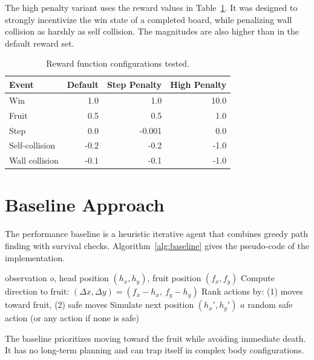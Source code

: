 \documentclass[10pt, conference, letterpaper]{IEEEtran}
\begin{document}
The high penalty variant uses the reward values in Table~\ref{tab:rewards}. It was designed to strongly incentivize the win state of a completed board, while penalizing wall collision as harshly as self collision. The magnitudes are also higher than in the default reward set.

\begin{table}[t]
\centering
\caption{Reward function configurations tested.}
\label{tab:rewards}
\begin{tabular}{lrrr}
\toprule
Event & Default & Step Penalty & High Penalty \\
\midrule
Win            & 1.0  & 1.0    & 10.0 \\
Fruit          & 0.5  & 0.5    & 1.0 \\
Step           & 0.0  & -0.001 & 0.0 \\
Self-collision & -0.2 & -0.2   & -1.0 \\
Wall collision & -0.1 & -0.1   & -1.0 \\
\bottomrule
\end{tabular}
\end{table}

\section{Baseline Approach}

The performance baseline is a heuristic iterative agent that combines greedy path finding with survival checks. Algorithm~\ref{alg:baseline} gives the pseudo-code of the implementation.

\begin{algorithm}[t]
\caption{Greedy Baseline Agent}
\label{alg:baseline}
\begin{algorithmic}[1]
\Require observation $o$, head position $(h_x, h_y)$, fruit position $(f_x, f_y)$
\State Compute direction to fruit: $(\Delta x, \Delta y) = (f_x - h_x,\ f_y - h_y)$
\State Rank actions by: (1) moves toward fruit, (2) safe moves
  \State Simulate next position $(h_x', h_y')$
    \State \Return $a$
  \EndIf
\EndFor
\State \Return random safe action (or any action if none is safe)
\end{algorithmic}
\end{algorithm}

The baseline prioritizes moving toward the fruit while avoiding immediate death. It has no long-term planning and can trap itself in complex body configurations.
\end{document}
